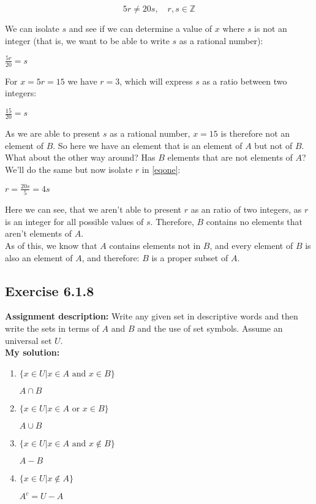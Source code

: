 \documentclass{article}
\newcommand{\cent}[1]{\begin{center}#1\end{center}}
\newcommand{\mat}[2]{\begin{equation} \label{#2}#1\end{equation}}
\newcommand{\doubleZ}{\mathbb{Z}}
\newcommand{\In}{\! \in \!}
\newcommand{\Assign}{\textbf{Assignment description: }}
\newcommand{\Solution}{\textbf{My solution: }}
\newcommand{\QED}{\boxed{}}
\newcommand{\Exercise}[1]{\subsection{Exercise #1}}
\begin{document}
	\mat{5r\neq20s, \quad r,s \In \doubleZ}{eqone}
	
	We can isolate $s$ and see if we can determine a value of $x$ where $s$ is not an integer (that is, we want to be able to write $s$ as a rational number):
	
	\cent{$\frac{5r}{20} = s$}
	
	For $x = 5r=15$ we have $r=3$, which will express $s$ as a ratio between two integers:
	
	\cent{$\frac{15}{20} = s$}
	
	As we are able to present $s$ as a rational number, $x=15$ is therefore not an element of $B$. So here we have an element that is an element of $A$ but not of $B$. What about the other way around? Has $B$ elements that are not elements of $A$? We'll do the same but now isolate $r$ in \eqref{eqone}:
	
	\cent{$r = \frac{20s}{5} = 4s $}
	
	Here we can see, that we aren't able to present $r$ as an ratio of two integers, as $r$ is an integer for all possible values of $s$. Therefore, $B$ contains no elements that aren't elements of $A$.\\
	
	As of this, we know that $A$ contains elements not in $B$, and every element of $B$ is also an element of $A$, and therefore: $B$ is a proper subset of $A$.\\
	\QED
	
	\Exercise{6.1.8}
	
	\Assign
	Write any given set in descriptive words and then write the sets in terms of $A$ and $B$ and the use of set symbols. Assume an universal set $U$.\\
	
	\Solution
	\begin{enumerate}[label=\textbf{\Alph*.}]
		\item $\{x \in U | x \In A \text{ and } x \In B\}$
		
		\cent{$A \cap B$}
		
		\item $\{x \In U | x \In A \text{ or } x \In B\}$
		
		\cent{$A \cup B$}
		
		\item $\{x \In U | x \In A \text{ and } x \notin B \}$
		
		\cent{$A - B$}
		
		\item $\{x \In U | x \notin A \}$
		
		\cent{$A^c = U - A$}
		
		\end{enumerate}
		
\end{document}
